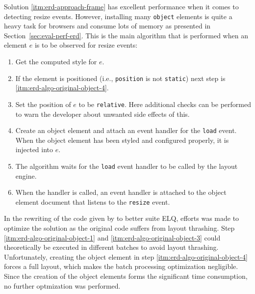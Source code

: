 \documentclass[a4paper,11pt]{kth-mag}
\newcommand{\code}[1]{\texttt{#1}}
\begin{document}
        Solution \ref{itm:erd-approach-frame} has excellent performance when it comes to detecting resize events.
        However, installing many \code{object} elements is quite a heavy task for browsers and consume lots of memory as presented in Section~\ref{sec:eval-perf-erd}.
        This is the main algorithm that is performed when an element $e$ is to be observed for resize events:
        \begin{enumerate}
          \item\label{itm:erd-algo-original-object-1} Get the computed style for $e$.
          \item                                       If the element is positioned (i.e., \code{position} is not \code{static}) next step is \ref{itm:erd-algo-original-object-4}.
          \item\label{itm:erd-algo-original-object-3} Set the position of $e$ to be \code{relative}. Here additional checks can be performed to warn the developer about unwanted side effects of this.
          \item\label{itm:erd-algo-original-object-4} Create an object element and attach an event handler for the \code{load} event. When the object element has been styled and configured properly, it is injected into $e$.
          \item                                       The algorithm waits for the \code{load} event handler to be called by the layout engine.
          \item                                       When the handler is called, an event handler is attached to the object element document that listens to the \code{resize} event.
        \end{enumerate}
        In the rewriting of the code given by \cite{backalley} to better suite \gls{ELQ}, efforts was made to optimize the solution as the original code suffers from layout thrashing.
        Step \ref{itm:erd-algo-original-object-1} and \ref{itm:erd-algo-original-object-3} could theoretically be executed in different batches to avoid layout thrashing.
        Unfortunately, creating the object element in step \ref{itm:erd-algo-original-object-4} forces a full layout, which makes the batch processing optimization negligible.
        Since the creation of the object elements forms the significant time consumption, no further optmization was performed.
\end{document}
